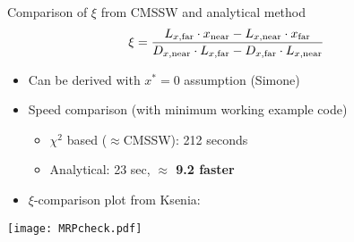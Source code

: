 \documentclass{beamer}
\begin{document}
\begin{frame}\scriptsize
	\begin{block}{Comparison of $\xi$ from CMSSW and analytical method}
		{\color{black}
		\begin{align}
			\xi&=\frac{L_{x,{\rm far}}\cdot x_{\rm near} - L_{x,{\rm near}}\cdot x_{\rm far}}{ D_{x,{\rm near}}\cdot L_{x,{\rm far}} -  D_{x,{\rm far}}\cdot L_{x,{\rm near}}} \label{reconstruction_formula_x}
		\end{align}}\vspace{-4mm}

	\begin{itemize}
		\item Can be derived with $x^{*}=0$ assumption (Simone)\vspace{-1mm}
		\item Speed comparison (with minimum working example code)
			\begin{itemize}\scriptsize
				\item $\chi^{2}$ based ($\approx$CMSSW):  212 seconds
				\item Analytical: 23 sec, {\bf\color{blue} $\approx$ 9.2 faster}
			\end{itemize}
		\item $\xi$-comparison plot from Ksenia:
	\end{itemize}\vspace{-4mm}
		\begin{center}
        	     \texttt{[image: MRPcheck.pdf]}
		\end{center}
	\end{block}
\end{frame}
\end{document}
